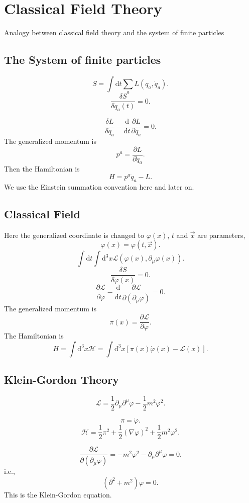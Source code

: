\section{Classical Field Theory}
Analogy between classical field theory and the system of finite particles
\subsection{The System of finite particles}
\[
  S=\int \mathrm{d}t \sum_{a}L\left( q_a,\dot{q}_a \right)  
.\]
\[
  \frac{\delta S}{\delta q_a\left( t \right) }=0		
.\]

\[
  \frac{\delta L}{\delta q_a}-\frac{\mathrm{d}}{\mathrm{d}t}\frac{\partial L}{\partial \dot{q}_a}=0
.\] 
The generalized momentum is
\[
  p^{a}=\frac{\partial L}{\partial \dot{q}_a}
.\] 
Then the Hamiltonian is
\[
  H=p^a\dot{q}_a-L
.\] 
We use the Einstein summation convention here and later on.

\subsection{Classical Field}
Here the generalized coordinate is changed to $\varphi\left( x \right) $, $t$ and $\vec{x}$ are parameters,
 \[
   \varphi\left( x \right) =\varphi\left( t,\vec{x} \right) 
.\]
\[
  \int \mathrm{d}t\int \mathrm{d}^3x\mathcal{L}\left( \varphi\left( x \right) ,\partial_\mu\varphi\left( x \right)  \right) 
.\]  
\[
  \frac{\delta S}{\delta \varphi\left( x \right) }=0
.\] 
\[
  \frac{\partial \mathcal{L}}{\partial \varphi}-\frac{\mathrm{d}}{\mathrm{d}t} \frac{\partial \mathcal{L}}{\partial\left( \partial_\mu\varphi \right) }=0
.\]
The generalized momentum is
\[
  \pi(x)=\frac{\partial \mathcal{L}}{\partial \dot{\varphi}}
.\] 
The Hamiltonian is
\[
  H=\int \mathrm{d}^3x\mathcal{H}=\int \mathrm{d}^3x\left[ \pi(x)\dot{\varphi}(x)-\mathcal{L}(x) \right] 
.\]
\subsection{Klein-Gordon Theory}
\[
\mathcal{L}=\frac{1}{2}\partial_\mu\partial^\mu\varphi -\frac{1}{2}m^2\varphi^2
.\]
  
\[
  \pi=\dot{\varphi}
.\] 
\[
  \mathcal{H}=\frac{1}{2}\pi^2+\frac{1}{2}(\nabla \varphi)^2+\frac{1}{2}m^2\varphi^2
.\]

\[
  \frac{\partial \mathcal{L}}{\partial(\partial_\mu\varphi)}=-m^2\varphi^2-\partial_\mu\partial^\mu\varphi=0
.\]
i.e.,
\[
  (\partial^2+m^2)\varphi=0
.\]
This is the Klein-Gordon equation.

